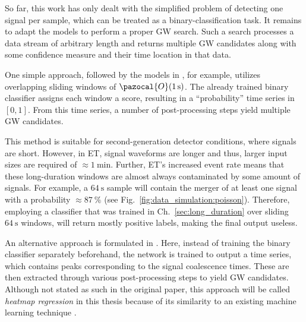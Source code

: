
So far, this work has only dealt with the simplified problem of detecting one signal per sample, which can be treated as a binary-classification task. It remains to adapt the models to perform a proper GW search. Such a search processes a data stream of arbitrary length and returns multiple GW candidates along with some confidence measure and their time location in that data.


One simple approach, followed by the models in \cite{Sch_fer_2023}, for example, utilizes overlapping sliding windows of $\pazocal{O}(\SI{1}{\second})$. The already trained binary classifier assigns each window a score, resulting in a \enquote{probability} time series in $[0,1]$. From this time series, a number of post-processing steps yield multiple GW candidates.

This method is suitable for second-generation detector conditions, where signals are short. However, in ET, signal waveforms are longer and thus, larger input sizes are required of $\approx\SI{1}{\minute}$. Further, ET's increased event rate means that these long-duration windows are almost always contaminated by some amount of signals. For example, a $\SI{64}{\second}$ sample will contain the merger of at least one signal with a probability $\approx\SI{87}{\percent}$ (see Fig.~\ref{fig:data_simulation:poisson}). Therefore, employing a classifier that was trained in Ch.~\ref{sec:long_duration} over sliding $\SI{64}{\second}$ windows, will return mostly positive labels, making the final output useless.

An alternative approach is formulated in \cite{PhysRevD.100.063015}. Here, instead of training the binary classifier separately beforehand, the network is trained to output a time series, which contains peaks corresponding to the signal coalescence times. These are then extracted through various post-processing steps to yield GW candidates. 
Although not stated as such in the original paper, this approach will be called \emph{heatmap regression} in this thesis because of its similarity to an existing machine learning technique \cite{tompson2014jointtrainingconvolutionalnetwork}. 

